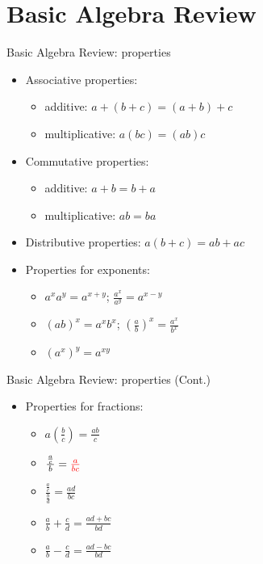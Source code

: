 \documentclass{beamer}
\newcommand{\red}[1]{\textcolor{red}{#1}}
\begin{document}
\section{Basic Algebra Review}%
\label{sec:basic_algebra_review}

\begin{frame}[t]{Basic Algebra Review: properties}
    \begin{itemize}
        \item Associative properties:
	    \begin{itemize}
		\item additive: $a + \left( b+c \right) = \left( a+b \right) +c$
		\item multiplicative: $a\left( bc \right) = \left( ab \right) c$
	    \end{itemize}
	\item Commutative properties:
	    \begin{itemize}
		\item additive: $a+b = b+a$
		\item multiplicative: $ab = ba$
	    \end{itemize}
	\item Distributive properties: $a\left( b+c \right) = ab + ac$
	\item Properties for exponents:
	    \begin{itemize}
	        \item $a^{x} a^{y} = a^{x+y} $; $\frac{a^{x} }{a^{y} } = a^{x-y} $
		\item $\left( ab \right)^{x} = a^{x} b^{x} $; $\left( \frac{a}{b}  \right)^{x} = \frac{a^{x} }{b^{x} } $
		\item $\left( a^{x}  \right)^{y} = a^{xy} $
	    \end{itemize}
    \end{itemize}
\end{frame}

\begin{frame}[t]{Basic Algebra Review: properties (Cont.)}
    \begin{itemize}
        \item Properties for fractions:
	    \begin{itemize}
		\item $a\left( \frac{b}{c}  \right) = \frac{ab}{c} $
		    \vspace{0.5em}
		\item $\frac{\frac{a}{c} }{b} = \red{\frac{a}{bc}} $
		    \vspace{0.5em}
		\item $\frac{\frac{a}{c} }{\frac{b}{d} } = \frac{ad}{bc} $
		    \vspace{0.5em}
		\item $\frac{a}{b} + \frac{c}{d} = \frac{ad + bc}{bd} $
		\item $\frac{a}{b} - \frac{c}{d} = \frac{ad - bc}{bd} $
	    \end{itemize}
    \end{itemize}
\end{frame}
\end{document}
